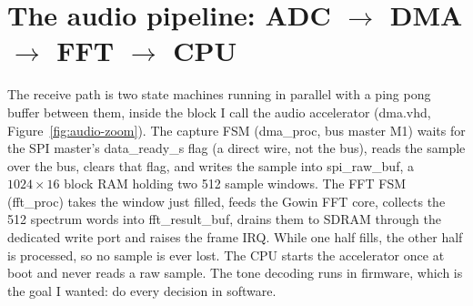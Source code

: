 \documentclass[a4paper,10pt]{article}
\begin{document}
\section{The audio pipeline: ADC $\to$ DMA $\to$ FFT $\to$ CPU}
\label{sec:accel}

The receive path is two state machines running in parallel with a ping pong buffer
between them, inside the block I call the audio accelerator (dma.vhd,
Figure~\ref{fig:audio-zoom}). The capture FSM (dma\_proc, bus master M1)
waits for the SPI master's data\_ready\_s flag (a direct wire, not the bus), reads
the sample over the bus, clears that flag, and writes the sample into spi\_raw\_buf,
a $1024\times16$ block RAM holding two 512 sample windows. The FFT FSM
(fft\_proc) takes the window just filled, feeds the Gowin FFT core, collects
the 512 spectrum words into fft\_result\_buf, drains them to SDRAM through
the dedicated write port and raises the frame IRQ. While one half fills, the other
half is processed, so no sample is ever lost. The CPU starts the accelerator once at
boot and never reads a raw sample. The tone decoding runs in firmware, which is the
goal I wanted: do every decision in software.
\end{document}
